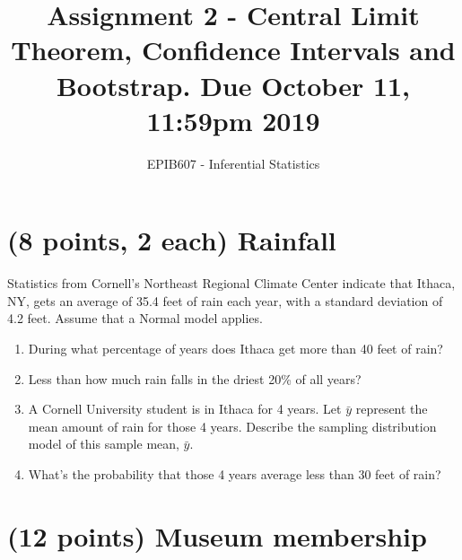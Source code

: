 \documentclass[letterpaper,12pt,twoside,]{pinp}
\title{Assignment 2 - Central Limit Theorem, Confidence Intervals and
Bootstrap. Due October 11, 11:59pm 2019}
\author[a]{EPIB607 - Inferential Statistics}
\affil[a]{Fall 2020, McGill University}
\providecommand{\tightlist}{%
  \setlength{\itemsep}{0pt}\setlength{\parskip}{0pt}}
\begin{document}
\verticaladjustment{-2pt}

\maketitle
\thispagestyle{firststyle}



\hypertarget{points-2-each-rainfall}{%
\section{(8 points, 2 each) Rainfall}\label{points-2-each-rainfall}}

Statistics from Cornell's Northeast Regional Climate Center indicate
that Ithaca, NY, gets an average of 35.4 feet of rain each year, with a
standard deviation of 4.2 feet. Assume that a Normal model applies.

\begin{enumerate}
\def\labelenumi{\alph{enumi}.}
\tightlist
\item
  During what percentage of years does Ithaca get more than 40 feet of
  rain?
\item
  Less than how much rain falls in the driest 20\% of all years?
\item
  A Cornell University student is in Ithaca for 4 years. Let \(\bar{y}\)
  represent the mean amount of rain for those 4 years. Describe the
  sampling distribution model of this sample mean, \(\bar{y}\).
\item
  What's the probability that those 4 years average less than 30 feet of
  rain?
\end{enumerate}

\hypertarget{points-museum-membership}{%
\section{(12 points) Museum membership}\label{points-museum-membership}}
\end{document}
